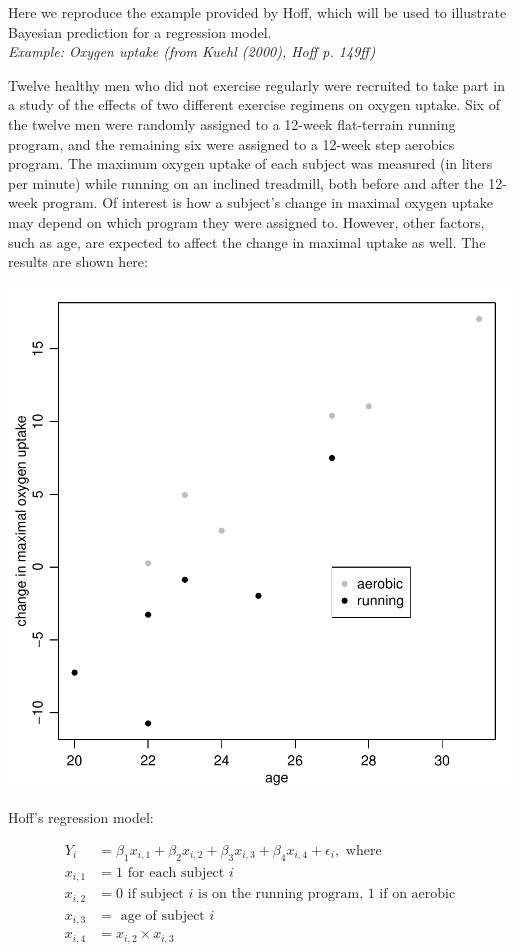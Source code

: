 \documentclass[12pt, a4paper]{article}
\begin{document}
\noindent Here we reproduce the example provided by Hoff, which will be used to illustrate Bayesian prediction for a regression model.\\

\noindent\textit{Example:  Oxygen uptake (from Kuehl (2000), Hoff p. 149ff)}

\noindent Twelve healthy men who did not exercise regularly were recruited to take part in a study of the effects of two different exercise regimens on oxygen uptake.  Six of the twelve men were randomly assigned to a 12-week flat-terrain running program, and the remaining six were assigned to a 12-week step aerobics program.  The maximum oxygen uptake of each subject was measured (in liters per minute) while running on an inclined treadmill, both before and after the 12-week program.  Of interest is how a subject's change in maximal oxygen uptake may depend on which program they were assigned to.  However, other factors, such as age, are expected to affect the change in maximal uptake as well.  The results are shown here:

\includegraphics{Thesis_v4-012}

\noindent Hoff's regression model:

    \begin{align}
        Y_i &= \beta_1x_{i,1} + \beta_2x_{i,2} + \beta_3x_{i,3} + \beta_4x_{i,4} + \epsilon_i, \text{ where} \label{example_regression_model}\\
        x_{i,1} &= 1 \text{ for each subject } i \nonumber \\
        x_{i,2} &= 0 \text{ if subject } i \text{ is on the running program, } 1 \text{ if on aerobic} \nonumber \\
        x_{i,3} &= \text{ age of subject } i \nonumber \\
        x_{i,4} &= x_{i,2} \times x_{i,3} \nonumber
    \end{align}
\end{document}
